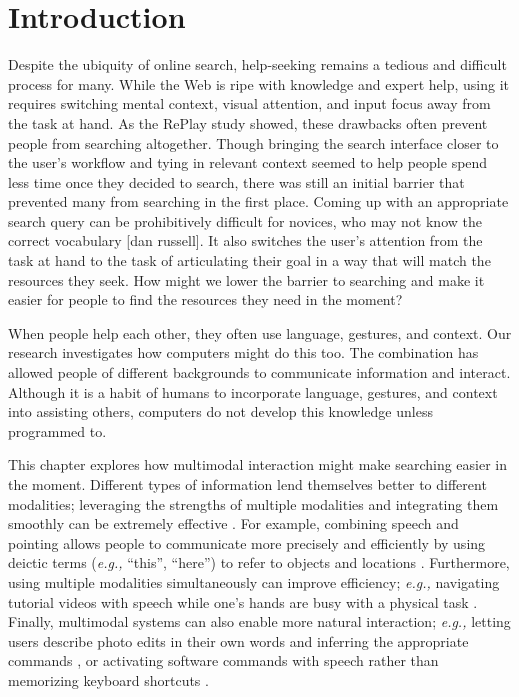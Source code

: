 \section{Introduction}
Despite the ubiquity of online search, help-seeking remains a tedious and difficult process for many. While the Web is ripe with knowledge and expert help, using it requires switching mental context, visual attention, and input focus away from the task at hand. As the RePlay study showed, these drawbacks often prevent people from searching altogether. Though bringing the search interface closer to the user's workflow and tying in relevant context seemed to help people spend less time once they decided to search, there was still an initial barrier that prevented many from searching in the first place. 
Coming up with an appropriate search query can be prohibitively difficult for novices, who may not know the correct vocabulary [dan russell]. It also switches the user's attention from the task at hand to the task of articulating their goal in a way that will match the resources they seek. How might we lower the barrier to searching and make it easier for people to find the resources they need in the moment?

When people help each other, they often use language, gestures, and context. Our research investigates how computers might do this too. The combination has allowed people of different backgrounds to communicate information and interact. Although it is a habit of humans to incorporate language, gestures, and context into assisting others, computers do not develop this knowledge unless programmed to. 

This chapter explores how multimodal interaction might make searching easier in the moment. Different types of information lend themselves better to different modalities; leveraging the strengths of multiple modalities and integrating them smoothly can be extremely effective \cite{Oviatt1999}. For example, combining speech and pointing allows people to communicate more precisely and efficiently by using deictic terms (\textit{e.g.,} ``this'', ``here'') to refer to objects and locations \cite{Bolt1980, Linder2013}. Furthermore, using multiple modalities simultaneously can improve efficiency; \textit{e.g.,} navigating tutorial videos with speech while one's hands are busy with a physical task \cite{Chang2019}. Finally, multimodal systems can also enable more natural interaction; \textit{e.g.,} letting users describe photo edits in their own words and inferring the appropriate commands \cite{Linder2013}, or activating software commands with speech rather than memorizing keyboard shortcuts \cite{Kim2019}.

